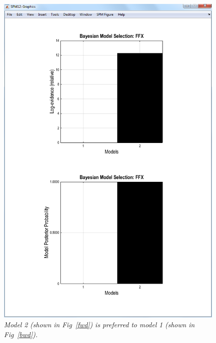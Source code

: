 \begin{figure}[ht]
\begin{center}
\includegraphics[width=140mm]{dcm/Fig9}
\caption{\em Model 2 (shown in Fig~\ref{fwd}) is preferred to model 1 (shown in Fig~\ref{bwd}).\label{dcm_fig9}}
\end{center}
\end{figure}

